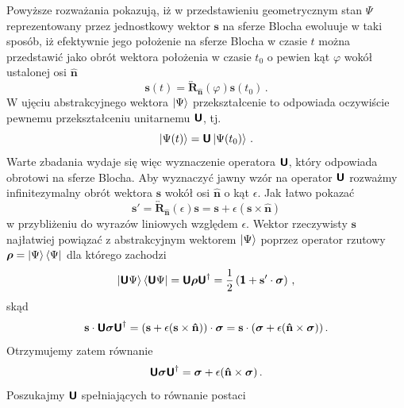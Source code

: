 \documentclass{myclass}
\begin{document}
Powyższe rozważania pokazują, iż w przedstawieniu geometrycznym stan \(\Psi\) reprezentowany przez
jednostkowy wektor \(\mathbf{s}\) na sferze Blocha ewoluuje w taki sposób, iż efektywnie jego
położenie na sferze Blocha w czasie \(t\) można przedstawić jako obrót wektora położenia w czasie
\(t_0\) o pewien kąt \(\varphi\) wokół ustalonej osi \(\mathbf{\hat{n}}\)
\begin{equation*}
    \mathbf{s}(t) = \overleftrightarrow{\mathbf{R}}_\mathbf{\hat{n}}(\varphi)\mathbf{s}(t_0)\,.
\end{equation*}
W ujęciu abstrakcyjnego wektora \(\ket{\Psi}\) przekształcenie to odpowiada oczywiście pewnemu
przekształceniu unitarnemu \(\boldsymbol{\mathsf{U}}\), tj.
\begin{equation*}
    \ket{\Psi(t)} = \boldsymbol{\mathsf{U}}\ket{\Psi(t_0)}\,.
\end{equation*}
Warte zbadania wydaje się więc wyznaczenie operatora \(\boldsymbol{\mathsf{U}}\), który odpowiada obrotowi na
sferze Blocha. Aby wyznaczyć jawny wzór na operator \(\boldsymbol{\mathsf{U}}\) rozważmy infinitezymalny obrót
wektora \(\mathbf{s}\) wokół osi \(\mathbf{\hat{n}}\) o kąt \(\epsilon\). Jak łatwo pokazać
\begin{equation*}
    \mathbf{s}' = \overleftrightarrow{\mathbf{R}}_\mathbf{\hat{n}}(\epsilon)\mathbf{s} = \mathbf{s} + \epsilon(\mathbf{s}\times\mathbf{\hat{n}})
\end{equation*}
w przybliżeniu do wyrazów liniowych względem \(\epsilon\). Wektor rzeczywisty \(\mathbf{s}\)
najłatwiej powiązać z abstrakcyjnym wektorem \(\ket{\Psi}\) poprzez operator rzutowy \(\boldsymbol{\mathsf{\rho}} =
\ket{\Psi}\bra{\Psi}\) dla którego zachodzi
\begin{equation*}
    \ket{\boldsymbol{\mathsf{U}}\Psi}\bra{\boldsymbol{\mathsf{U}}\Psi} = \boldsymbol{\mathsf{U}}\boldsymbol{\mathsf{\rho}}\boldsymbol{\mathsf{U}}^\dagger = \frac{1}{2}\left(\boldsymbol{\mathsf{1}} + \mathbf{s}'\cdot\boldsymbol{\sigma}\right)\,,
\end{equation*}
skąd
\begin{equation*}
    \mathbf{s}\cdot\boldsymbol{\mathsf{U}}\boldsymbol{\sigma}\boldsymbol{\mathsf{U}}^\dagger = (\mathbf{s} + \epsilon(\mathbf{s}\times\mathbf{\hat{n}}))\cdot\boldsymbol{\sigma} = \mathbf{s}\cdot(\boldsymbol{\sigma} + \epsilon(\mathbf{\hat{n}}\times\boldsymbol{\sigma}))\,.
\end{equation*}
Otrzymujemy zatem równanie
\begin{equation*}
    \boldsymbol{\mathsf{U}}\boldsymbol{\sigma}\boldsymbol{\mathsf{U}}^\dagger = \boldsymbol{\sigma} + \epsilon(\mathbf{\hat{n}}\times\boldsymbol{\sigma})\,.
\end{equation*}
Poszukajmy \(\boldsymbol{\mathsf{U}}\) spełniających to równanie postaci
\end{document}
